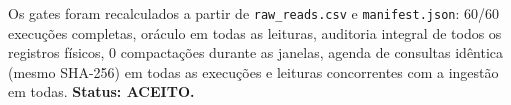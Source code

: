 Os gates foram recalculados a partir de \texttt{raw\_reads.csv} e \texttt{manifest.json}: 60/60 execuções completas, oráculo em todas as leituras, auditoria integral de todos os registros físicos, 0 compactações durante as janelas, agenda de consultas idêntica (mesmo SHA-256) em todas as execuções e leituras concorrentes com a ingestão em todas. \textbf{Status: ACEITO.}
